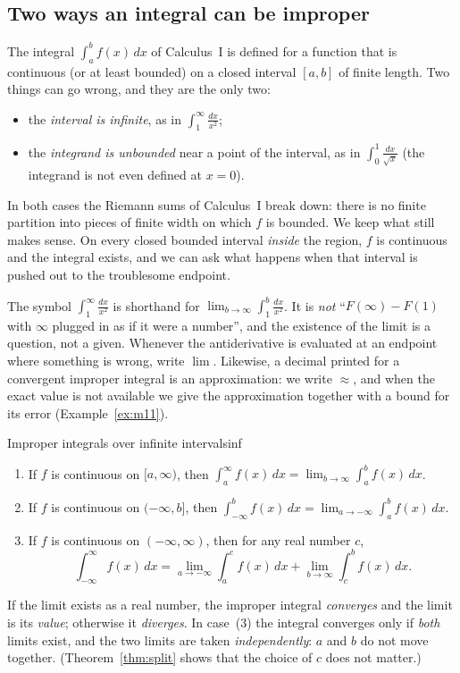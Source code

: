 \documentclass[11pt]{article}
\begin{document}
\subsection*{Two ways an integral can be improper}

The integral $\int_a^bf(x)\,dx$ of Calculus~I is defined for a function that is continuous (or at least bounded) on a closed interval $[a,b]$ of finite length. Two things can go wrong, and they are the only two:
\begin{itemize}
  \item the \emph{interval is infinite}, as in $\int_1^\infty\frac{dx}{x^2}$;
  \item the \emph{integrand is unbounded} near a point of the interval, as in $\int_0^1\frac{dx}{\sqrt x}$ (the integrand is not even defined at $x=0$).
\end{itemize}
In both cases the Riemann sums of Calculus~I break down: there is no finite partition into pieces of finite width on which $f$ is bounded. We keep what still makes sense. On every closed bounded interval \emph{inside} the region, $f$ is continuous and the integral exists, and we can ask what happens when that interval is pushed out to the troublesome endpoint.

\begin{warn}
The symbol $\int_1^\infty\frac{dx}{x^2}$ is shorthand for $\lim_{b\to\infty}\int_1^b\frac{dx}{x^2}$. It is \emph{not} ``$F(\infty)-F(1)$ with $\infty$ plugged in as if it were a number'', and the existence of the limit is a question, not a given. Whenever the antiderivative is evaluated at an endpoint where something is wrong, write $\lim$. Likewise, a decimal printed for a convergent improper integral is an approximation: we write $\approx$, and when the exact value is not available we give the approximation together with a bound for its error (Example~\ref{ex:m11}).
\end{warn}

\begin{defn}{Improper integrals over infinite intervals}{inf}
\begin{enumerate}[label=(\arabic*),leftmargin=*]
  \item If $f$ is continuous on $[a,\infty)$, then $\displaystyle\int_a^\infty f(x)\,dx=\lim_{b\to\infty}\int_a^bf(x)\,dx$.
  \item If $f$ is continuous on $(-\infty,b]$, then $\displaystyle\int_{-\infty}^bf(x)\,dx=\lim_{a\to-\infty}\int_a^bf(x)\,dx$.
  \item If $f$ is continuous on $(-\infty,\infty)$, then for any real number $c$,
  \[\int_{-\infty}^\infty f(x)\,dx=\lim_{a\to-\infty}\int_a^cf(x)\,dx+\lim_{b\to\infty}\int_c^bf(x)\,dx .\]
\end{enumerate}
If the limit exists as a real number, the improper integral \emph{converges} and the limit is its \emph{value}; otherwise it \emph{diverges}. In case~(3) the integral converges only if \emph{both} limits exist, and the two limits are taken \emph{independently}: $a$ and $b$ do not move together. (Theorem~\ref{thm:split} shows that the choice of $c$ does not matter.)
\end{defn}
\end{document}
